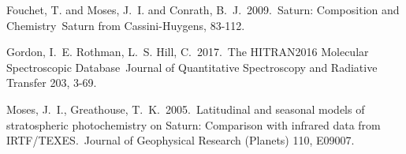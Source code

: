 \documentclass[12pt]{article}
\begin{document}
\begin{thebibliography}{28}
 Fouchet, T. and Moses, J.~I. and
Conrath, B.~J.\ 2009.\ Saturn: Composition and Chemistry\ Saturn from
Cassini-Huygens, 83-112.

 {Gordon}, I.~E. {Rothman}, L.~S.
{Hill}, C.\ 2017.\ The HITRAN2016 Molecular Spectroscopic Database\ Journal of
Quantitative Spectroscopy and Radiative Transfer 203, 3-69.

 Moses, J.~I., Greathouse, T.~K.\
2005.\ Latitudinal and seasonal models of stratospheric photochemistry on
Saturn: Comparison with infrared data from IRTF/TEXES.\ Journal of
Geophysical Research (Planets) 110, E09007.

\end{thebibliography}
\end{document}
